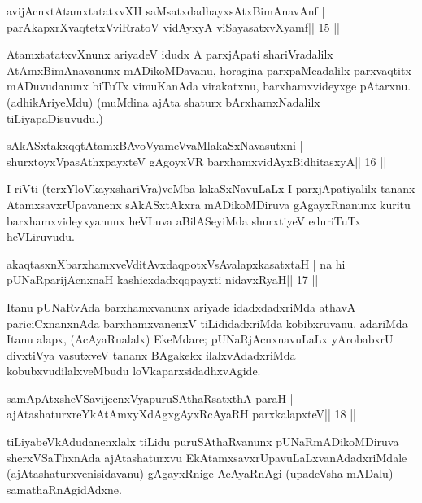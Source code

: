 \begin{shl}
avijAcnxtAtamxtatatxvXH saMsatxdadhayxsAtxBimAnavAnf |
parAkapxrXvaqtetxVviRratoV vidAyxyA viSayasatxvXyamf\hfill || 15 ||
\end{shl}

\begin{artha}
AtamxtatatxvXnunx ariyadeV idudx A parxjApati shariVradalilx 
AtAmxBimAnavanunx mADikoMDavanu, horagina parxpaMcadalilx parxvaqtitx 
mADuvudanunx biTuTx vimuKanAda virakatxnu, barxhamxvideyxge pAtarxnu. 
(adhikAriyeMdu) (muMdina ajAta shaturx bArxhamxNadalilx 
tiLiyapaDisuvudu.)
\end{artha}

\begin{shl}
sAkASxtakxqqtAtamxBAvoV\s yameVvaMlakaSxNavasutxni |
shurxtoyxVpasAthxpayxteV gAgoyxVR barxhamxvidAyxBidhitasxyA\hfill || 16 ||
\end{shl}

\begin{artha}
I riVti (terxYloVkayxshariVra)veMba lakaSxNavuLaLx I parxjApatiyalilx 
tananx AtamxsavxrUpavanenx sAkASxtAkxra mADikoMDiruva gAgayxRnanunx kuritu barxhamxvideyxyanunx heVLuva aBilASeyiMda shurxtiyeV eduriTuTx heVLiruvudu.
\end{artha} 
 

\begin{shl}
akaqtasxnXbarxhamxveVditAvxdaqpotxV\s sAvalapxkasatxtaH |
na hi pUNaRparijAcnxnaH kashicxdadxqqpayxti nidavxRyaH\hfill || 17 ||
\end{shl}

\begin{artha}
Itanu pUNaRvAda barxhamxvanunx ariyade idadxdadxriMda athavA pariciCxnanxnAda barxhamxvanenxV tiLididadxriMda kobibxruvanu. adariMda Itanu alapx, (AcAyaRnalalx) EkeMdare; pUNaRjAcnxnavuLaLx yArobabxrU divxtiVya vasutxveV tananx BAgakekx ilalxvAdadxriMda kobubxvudilalxveMbudu loVkaparxsidadhxvAgide.
\end{artha}

\begin{shl}
samApAtxsheVSavijecnxVyapuruSAthaRsatxthA paraH |
ajAtashaturxreYkAtAmxyXdAgxgAyxRcAyaRH parxkalapxteV\hfill || 18 ||
\end{shl}

\begin{artha}
tiLiyabeVkAdudanenxlalx tiLidu puruSAthaRvanunx pUNaRmADikoMDiruva sherxVSaThxnAda ajAtashaturxvu EkAtamxsavxrUpavuLaLxvanAdadxriMdale (ajAtashaturxvenisidavanu) gAgayxRnige AcAyaRnAgi (upadeVsha mADalu) samathaRnAgidAdxne.
\end{artha}

